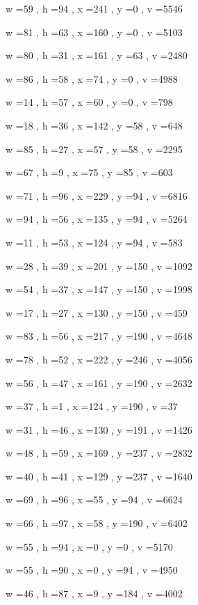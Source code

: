 \documentclass[11pt]{article}
\begin{document}
w =59 , h =94 , x =241 , y =0 , v =5546
\par
w =81 , h =63 , x =160 , y =0 , v =5103
\par
w =80 , h =31 , x =161 , y =63 , v =2480
\par
w =86 , h =58 , x =74 , y =0 , v =4988
\par
w =14 , h =57 , x =60 , y =0 , v =798
\par
w =18 , h =36 , x =142 , y =58 , v =648
\par
w =85 , h =27 , x =57 , y =58 , v =2295
\par
w =67 , h =9 , x =75 , y =85 , v =603
\par
w =71 , h =96 , x =229 , y =94 , v =6816
\par
w =94 , h =56 , x =135 , y =94 , v =5264
\par
w =11 , h =53 , x =124 , y =94 , v =583
\par
w =28 , h =39 , x =201 , y =150 , v =1092
\par
w =54 , h =37 , x =147 , y =150 , v =1998
\par
w =17 , h =27 , x =130 , y =150 , v =459
\par
w =83 , h =56 , x =217 , y =190 , v =4648
\par
w =78 , h =52 , x =222 , y =246 , v =4056
\par
w =56 , h =47 , x =161 , y =190 , v =2632
\par
w =37 , h =1 , x =124 , y =190 , v =37
\par
w =31 , h =46 , x =130 , y =191 , v =1426
\par
w =48 , h =59 , x =169 , y =237 , v =2832
\par
w =40 , h =41 , x =129 , y =237 , v =1640
\par
w =69 , h =96 , x =55 , y =94 , v =6624
\par
w =66 , h =97 , x =58 , y =190 , v =6402
\par
w =55 , h =94 , x =0 , y =0 , v =5170
\par
w =55 , h =90 , x =0 , y =94 , v =4950
\par
w =46 , h =87 , x =9 , y =184 , v =4002
\par
\newpage
\end{document}
